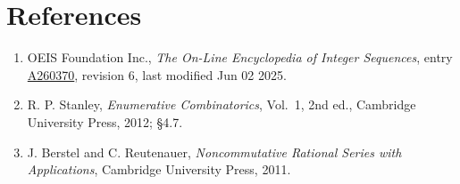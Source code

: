 \documentclass[11pt]{article}
\theoremstyle{definition}
\begin{document}
\section{References}

\begin{enumerate}

\item OEIS Foundation Inc., \emph{The On-Line Encyclopedia of Integer Sequences}, entry \href{https://oeis.org/A260370}{A260370}, revision 6, last modified Jun 02 2025.

\item R. P. Stanley, \emph{Enumerative Combinatorics}, Vol.~1, 2nd ed., Cambridge University Press, 2012; \S4.7.

\item J. Berstel and C. Reutenauer, \emph{Noncommutative Rational Series with Applications}, Cambridge University Press, 2011.

\end{enumerate}
\end{document}
